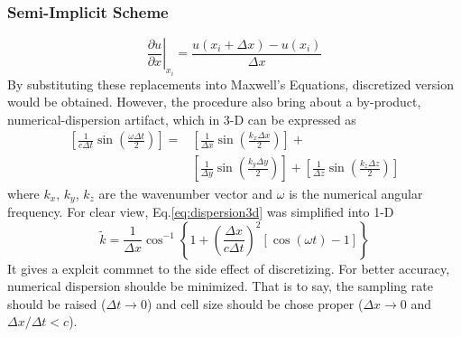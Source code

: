 \subsubsection{Semi-Implicit Scheme}
\begin{equation}
  \left.\frac{\partial u}{\partial x}\right|_{x_i} = \frac{u(x_i+\Delta x) - u(x_i)}{\Delta x}
\end{equation}
By substituting these replacements into Maxwell's Equations, discretized version would be obtained. However, the
procedure also bring about a by-product, numerical-dispersion artifact, which in 3-D can be expressed as
\begin{equation}
  \label{eq:dispersion3d}
  \begin{split}
    \left[\frac{1}{c\Delta t}\sin\left(\frac{\omega\Delta t}{2}\right)\right] = &
    \left[\frac{1}{\Delta x}\sin\left(\frac{k_x\Delta x}{2}\right)\right] + \\ &
    \left[\frac{1}{\Delta y}\sin\left(\frac{k_y\Delta y}{2}\right)\right] +
    \left[\frac{1}{\Delta z}\sin\left(\frac{k_z\Delta z}{2}\right)\right]
  \end{split}
\end{equation}
where $k_x$, $k_y$, $k_z$ are the wavenumber vector and $\omega$ is the numerical angular frequency. For clear view,
Eq.\ref{eq:dispersion3d} was simplified into 1-D
\begin{equation}
  \widetilde{k} = \frac{1}{\Delta x} \cos^{-1} \left\{1+\left(\frac{\Delta x}{c\Delta t}\right)^2\left[\cos(\omega t)-1\right]\right\}
\end{equation}
It gives a explcit commnet to the side effect of discretizing. For better accuracy, numerical dispersion shoulde be
minimized. That is to say, the sampling rate should be raised ($\Delta t \rightarrow 0$) and cell size should be chose
proper ($\Delta x \rightarrow 0$ and $\Delta x/\Delta t < c$).


